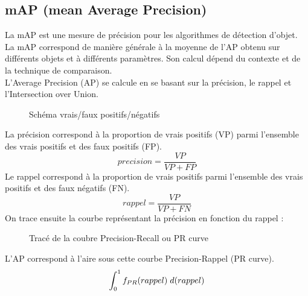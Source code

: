 \begin{appendices}
	
\section*{mAP (mean Average Precision)}\label{app:mAP}
La mAP est une mesure de précision pour les algorithmes de détection d'objet. La mAP correspond de manière générale à la moyenne de l'AP obtenu sur différents objets et à différents paramètres. Son calcul dépend du contexte et de la technique de comparaison.\\
L'Average Precision (AP) se calcule en se basant sur la précision, le rappel et l'Intersection over Union. 
\begin{figure}[!htbp]
\center
\caption{Schéma vrais/faux positifs/négatifs}
\label{fig:schema_vraifaux}
\end{figure}
\FloatBarrier
La précision correspond à la proportion de vrais positifs (VP) parmi l'ensemble des vrais positifs et des faux positifs (FP). 
$$precision = \frac{VP}{VP+FP}$$
Le rappel correspond à la proportion de vrais positifs parmi l'ensemble des vrais positifs et des faux négatifs (FN).
$$rappel = \frac{VP}{VP+FN}$$
On trace ensuite la courbe représentant la précision en fonction du rappel : 
\begin{figure}[!htbp]
\center
\caption{Tracé de la coubre Precision-Recall ou PR curve}
\label{fig:trace_prcurve}
\end{figure}
\FloatBarrier
L'AP correspond à l'aire sous cette courbe Precision-Rappel (PR curve). 
$$\int_{0}^{1} f_{PR}(rappel) \hspace{0.1cm} d(rappel)$$

	

	
\clearpage

\end{appendices}
